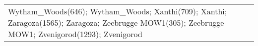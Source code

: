 \documentclass[journal abbreviation, manuscript]{copernicus}
\begin{document}
\begin{table}
\begin{tabularx}{\textwidth}{lX}
Wytham\_Woods(646); Wytham\_Woods; Xanthi(709); Xanthi; Zaragoza(1565); Zaragoza; Zeebrugge-MOW1(305); Zeebrugge-MOW1; Zvenigorod(1293); Zvenigorod                                                                                                                                                                                                                                                                                                                                                                                                                                                                                                                                                                                                                                                                                                                                                                                                                                                                                                                                                                                                        \\

\end{tabularx}
\end{table}
\end{document}
